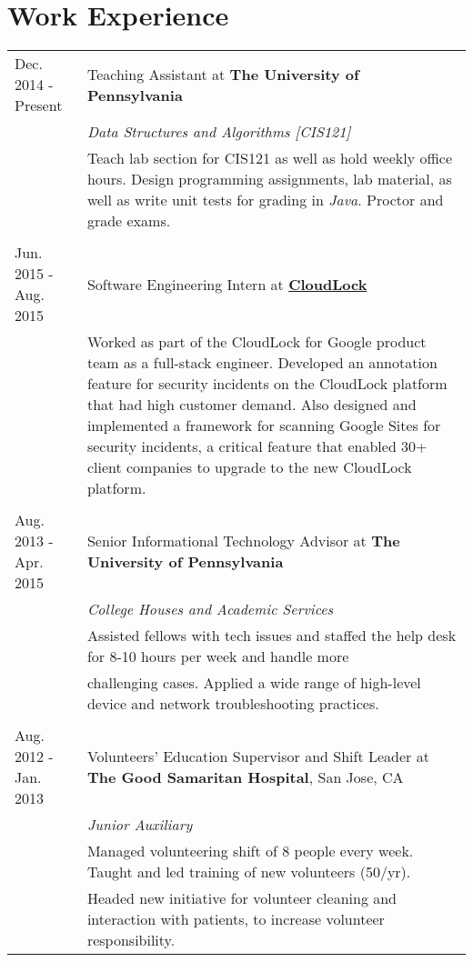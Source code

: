 \documentclass{resume}[10pt, a4paper]
\begin{document}
\section{Work Experience}
\begin{tabular}{p{3cm} | p{14cm}}
    Dec. 2014 - Present & Teaching Assistant at \textbf{The University of Pennsylvania}\\
                        & \textit{Data Structures and Algorithms [CIS121]}\\
                        & Teach lab section for CIS121 as well as hold weekly office hours. Design programming assignments, lab material, as well as write unit tests for grading in \textit{Java}. Proctor and grade exams.\\\\
    Jun. 2015 - Aug. 2015&Software Engineering Intern at \textbf{\href{http://cloudlock.com}{CloudLock}}\\
                         & Worked as part of the CloudLock for Google product team as a full-stack engineer. Developed an annotation feature for security incidents on the CloudLock platform that had high customer demand. Also designed and implemented a framework for scanning Google Sites for security incidents, a critical feature that enabled 30+ client companies to upgrade to the new CloudLock platform.\\\\
    Aug. 2013 -Apr. 2015& Senior Informational Technology Advisor at \textbf{The University of Pennsylvania}\\
                        & \textit{College Houses and Academic Services}\\
                        & Assisted fellows with tech issues and staffed the help desk for 8-10 hours per week and handle more\\ 
                        &challenging cases. Applied a wide range of high-level device and network troubleshooting practices.\\
    \\
  Aug. 2012 - Jan. 2013 & Volunteers' Education Supervisor and Shift Leader at \textbf{The Good Samaritan Hospital}, San Jose, CA\\
                        &\textit{Junior Auxiliary}\\
                        &Managed volunteering shift of 8 people every week. Taught and led training of new volunteers (50/yr).\\
                        &Headed new initiative for volunteer cleaning and interaction with patients, to increase volunteer responsibility.\\
\end{tabular}
\end{document}
